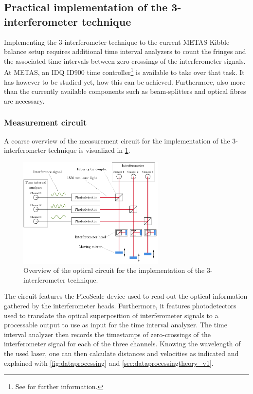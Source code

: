 \documentclass{report}
\numberwithin{tm}{section}
\begin{document}
\subsection{Practical implementation of the 3-interferometer technique}
Implementing the 3-interferometer technique to the current METAS Kibble balance setup requires additional time interval analyzers to count the fringes and the associated time intervals between zero-crossings of the interferometer signals. At METAS, an IDQ ID900 time controller\footnote{See \cite{IDQ.2018} for further information.} is available to take over that task. It has however to be studied yet, how this can be achieved. Furthermore, also more than the currently available components such as beam-splitters and optical fibres are necessary.

\subsubsection{Measurement circuit}
A coarse overview of the measurement circuit for the implementation of the 3-interferometer technique is visualized in \cref{fig:measurement_circuit}.
\begin{figure}[h]
	\centering
	\includegraphics[width=0.65\textwidth]{figures/measurement_circuit.pdf}
	\caption{Overview of the optical circuit for the implementation of the 3-interferometer technique.}
	\label{fig:measurement_circuit}
\end{figure}
The circuit features the PicoScale device used to read out the optical information gathered by the interferometer heads. Furthermore, it features photodetectors used to translate the optical superposition of interferometer signals to a processable output to use as input for the time interval analyzer. The time interval analyzer then records the timestamps of zero-crossings of the interferometer signal for each of the three channels. Knowing the wavelength of the used laser, one can then calculate distances and velocities as indicated and explained with \cref{fig:dataprocessing} and \cref{sec:dataprocessingtheory_v1}.
\end{document}
